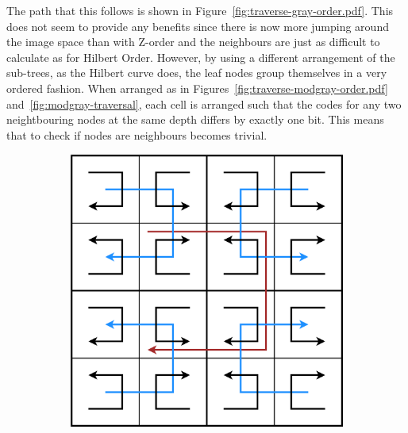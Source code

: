 The path that this follows is shown in
Figure~\ref{fig:traverse-gray-order.pdf}. This does not seem to provide any
benefits since there is now more jumping around the image space than with
Z-order and the neighbours are just as difficult to calculate as for Hilbert
Order. However, by using a different arrangement of the sub-trees, as the
Hilbert curve does, the leaf nodes group themselves in a very ordered fashion.
When arranged as in Figures~\ref{fig:traverse-modgray-order.pdf}
and~\ref{fig:modgray-traversal}, each cell is arranged such that the codes for
any two neightbouring nodes at the same depth differs by exactly one bit. This
means that to check if nodes are neighbours becomes trivial.

\begin{figure}[tbhp]
	\centering
	\begin{subfigure}[c]{3.4cm}
		\includegraphics[width=\textwidth]{modgray-2-levels-arrows.pdf}
		\caption{}\label{fig:modgray-2-levels-arrows.pdf}
	\end{subfigure}%
	\quad
	\begin{subfigure}[c]{4.6cm}

\end{subfigure}
\end{figure}
